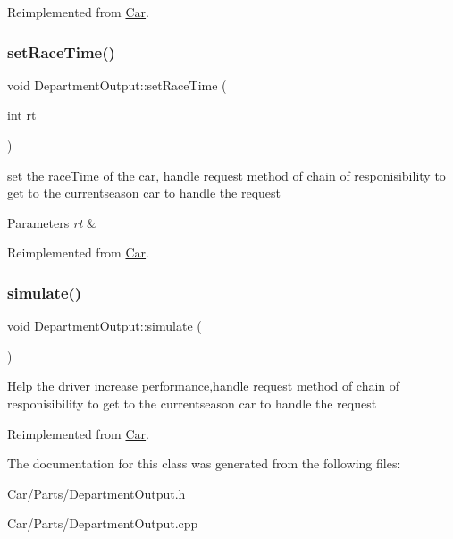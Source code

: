 Reimplemented from \hyperlink{classCar_ad7148bd1abe107ce2e2b134f78582c9d}{Car}.

\mbox{\label{classDepartmentOutput_a99c1b2cf729b25bc2f1d48214019c678}} 
\subsubsection{\texorpdfstring{set\+Race\+Time()}{setRaceTime()}}
{\footnotesize\ttfamily void Department\+Output\+::set\+Race\+Time (\begin{DoxyParamCaption}\item[{int}]{rt }\end{DoxyParamCaption})\hspace{0.3cm}{\ttfamily [virtual]}}

set the race\+Time of the car, handle request method of chain of responisibility to get to the currentseason car to handle the request 
\begin{DoxyParams}{Parameters}
{\em rt} & \\
\hline
\end{DoxyParams}


Reimplemented from \hyperlink{classCar_a72a79de673e860c1f177791bee87c529}{Car}.

\mbox{\label{classDepartmentOutput_a3c189e28c9d8899afafe3d6ee7d7602d}} 
\subsubsection{\texorpdfstring{simulate()}{simulate()}}
{\footnotesize\ttfamily void Department\+Output\+::simulate (\begin{DoxyParamCaption}{ }\end{DoxyParamCaption})\hspace{0.3cm}{\ttfamily [virtual]}}

Help the driver increase performance,handle request method of chain of responisibility to get to the currentseason car to handle the request 

Reimplemented from \hyperlink{classCar_af2532d9bbcda730f936f9633d8ee8d71}{Car}.



The documentation for this class was generated from the following files\+:\begin{DoxyCompactItemize}
\item 
Car/\+Parts/Department\+Output.\+h\item 
Car/\+Parts/Department\+Output.\+cpp\end{DoxyCompactItemize}

